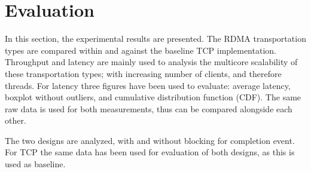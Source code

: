 
\chapter{Evaluation}\label{ch:evaluation} %



\ifpdf
    \graphicspath{{figures/PNG}}
\else
    \graphicspath{{7/figures/EPS/}{7/figures/}}
\fi


% 
In this section, the experimental results are presented.
The RDMA transportation types are compared within and against the baseline TCP implementation.
Throughput and latency are mainly used to analysis the multicore scalability of these transportation types; with increasing number of clients, and therefore threads.
For latency three figures have been used to evaluate: average latency, boxplot without outliers, and cumulative distribution function (CDF).
The same raw data is used for both measurements, thus can be compared alongside each other.

The two designs are analyzed, with and without blocking for completion event.
For TCP the same data has been used for evaluation of both designs, as this is used as baseline.

